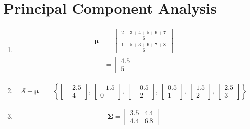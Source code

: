 \newpage
\section{Principal Component Analysis}
\begin{enumerate}[label=(\alph*)]
	\item
	      \begin{align*}
		      \bm{\mu} & = \begin{bmatrix}
			                   \frac{2 + 3 + 4 + 5 + 6 + 7}{6} \\
			                   \frac{1 + 5 + 3 + 6 + 7 + 8}{6}
		                   \end{bmatrix}
		      \\
		               & = \begin{bmatrix}
			                   4.5 \\ 5
		                   \end{bmatrix}
	      \end{align*}

	\item
	      \begin{align*}
		      \mathcal{S} - \bm{\mu} & = \left\{
		      \begin{bmatrix} -2.5 \\ -4 \end{bmatrix},\
		      \begin{bmatrix} -1.5 \\ 0 \end{bmatrix},\
		      \begin{bmatrix} -0.5 \\ -2 \end{bmatrix},\
		      \begin{bmatrix} 0.5 \\ 1 \end{bmatrix},\
		      \begin{bmatrix} 1.5 \\ 2 \end{bmatrix},\
		      \begin{bmatrix} 2.5 \\ 3 \end{bmatrix}
		      \right\}
	      \end{align*}

	\item
	      \[
		      \bm{\Sigma} = \begin{bmatrix}
			      3.5 & 4.4 \\
			      4.4 & 6.8
		      \end{bmatrix}
	      \]


\end{enumerate}
